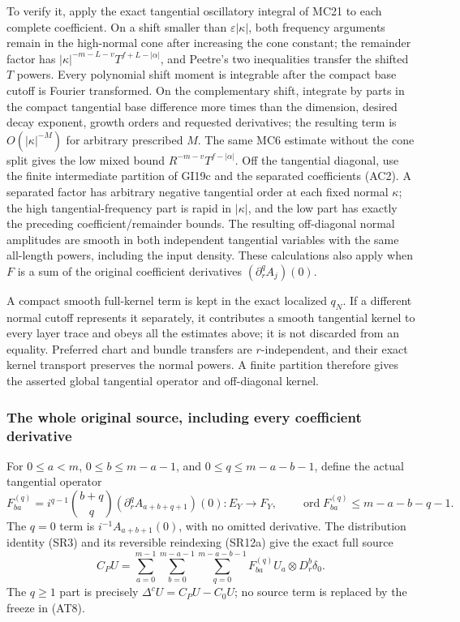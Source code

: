 \documentclass[
  11pt,
]{article}
\begin{document}
To verify it, apply the exact tangential oscillatory integral of MC21 to
each complete coefficient. On a shift smaller than
\(\varepsilon|\kappa|\), both frequency arguments remain in the
high-normal cone after increasing the cone constant; the remainder
factor has \(|\kappa|^{-m-L-v}T^{f+L-|\alpha|}\), and Peetre's two
inequalities transfer the shifted \(T\) powers. Every polynomial shift
moment is integrable after the compact base cutoff is Fourier
transformed. On the complementary shift, integrate by parts in the
compact tangential base difference more times than the dimension,
desired decay exponent, growth orders and requested derivatives; the
resulting term is \(O(|\kappa|^{-M})\) for arbitrary prescribed \(M\).
The same MC6 estimate without the cone split gives the low mixed bound
\(R^{-m-v}T^{f-|\alpha|}\). Off the tangential diagonal, use the finite
intermediate partition of GI19c and the separated coefficients (AC2). A
separated factor has arbitrary negative tangential order at each fixed
normal \(\kappa\); the high tangential-frequency part is rapid in
\(|\kappa|\), and the low part has exactly the preceding
coefficient/remainder bounds. The resulting off-diagonal normal
amplitudes are smooth in both independent tangential variables with the
same all-length powers, including the input density. These calculations
also apply when \(F\) is a sum of the original coefficient derivatives
\((\partial_r^qA_j)(0)\).

A compact smooth full-kernel term is kept in the exact localized
\(q_N\). If a different normal cutoff represents it separately, it
contributes a smooth tangential kernel to every layer trace and obeys
all the estimates above; it is not discarded from an equality. Preferred
chart and bundle transfers are \(r\)-independent, and their exact kernel
transport preserves the normal powers. A finite partition therefore
gives the asserted global tangential operator and off-diagonal kernel.

\subsubsection{The whole original source, including every coefficient
derivative}\label{the-whole-original-source-including-every-coefficient-derivative}

For \(0\leq a<m\), \(0\leq b\leq m-a-1\), and \(0\leq q\leq m-a-b-1\),
define the actual tangential operator \[
 F_{ba}^{(q)}
 =i^{q-1}\binom{b+q}{q}
   (\partial_r^q A_{a+b+q+1})(0):E_Y\longrightarrow F_Y,
 \qquad
 \operatorname{ord}F_{ba}^{(q)}\leq m-a-b-q-1 .
 \tag{AT7}
\] The \(q=0\) term is \(i^{-1}A_{a+b+1}(0)\), with no omitted
derivative. The distribution identity (SR3) and its reversible
reindexing (SR12a) give the exact full source \[
 C_PU=\sum_{a=0}^{m-1}\sum_{b=0}^{m-a-1}
       \sum_{q=0}^{m-a-b-1}
 F_{ba}^{(q)}U_a\otimes D_r^b\delta_0 .
 \tag{AT8}
\] The \(q\geq1\) part is precisely \(\Delta^cU=C_PU-C_0U\); no source
term is replaced by the freeze in (AT8).
\end{document}
